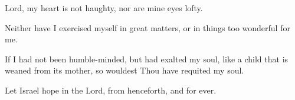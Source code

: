 Lord, my heart is not haughty, nor are mine eyes lofty.

Neither have I exercised myself in great matters, or in things too wonderful for me.

If I had not been humble-minded, but had exalted my soul, like a child that is weaned from its mother, so wouldest Thou have requited my soul.

Let Israel hope in the Lord, from henceforth, and for ever.
